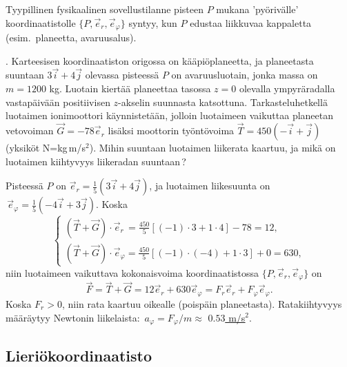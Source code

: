 Tyypillinen fysikaalinen sovellustilanne pisteen $P$ mukana 'pyörivälle' koordinaatistolle 
$\{P,\vec e_r,\vec e_\varphi\}$ syntyy, kun $P$ edustaa  liikkuvaa
kappaletta (esim.\ planeetta, avaruusalus). 
\begin{Exa}  . Karteesisen koordinaatiston
origossa on kääpiöplaneetta, ja planeetasta suuntaan $3\vec i+4\vec j$ olevassa pisteessä $P$
on avaruusluotain, jonka massa on $m=1200$ kg. Luotain kiertää planeettaa tasossa $z=0$
olevalla ympyräradalla vastapäivään positiivisen $z$-akselin suunnasta katsottuna.
Tarkasteluhetkellä luotaimen ionimoottori käynnistetään, jolloin luotaimeen vaikuttaa planeetan
vetovoiman $\vec G=-78\vec e_r$ lisäksi moottorin työntövoima $\vec T=450(-\vec i + \vec j)$
(yksiköt N=kg\,m/s$^2$). Mihin suuntaan luotaimen liikerata kaartuu, ja mikä on luotaimen
kiihtyvyys liikeradan suuntaan\,?
\end{Exa}
\ratk Pisteessä $P$ on $\vec e_r = \frac{1}{5}(3\vec i + 4\vec j)$, ja luotaimen liikesuunta on 
$\,\vec e_\varphi = \frac{1}{5}(-4\vec i + 3\vec j)$. Koska
\[ \begin{cases}
(\vec T + \vec G) \cdot \vec e_r\,    = \frac{450}{5}[(-1) \cdot 3 + 1 \cdot 4] - 78 = 12, \\
(\vec T + \vec G) \cdot \vec e_\varphi = \frac{450}{5}[(-1)\cdot(-4)+1 \cdot 3] + 0  = 630,
\end{cases} \] 
niin luotaimeen vaikuttava kokonaisvoima koordinaatistossa $\{P,\vec e_r,\vec e_\varphi\}$ on
\[
\vec F = \vec T + \vec G = 12 \vec e_r + 630 \vec e_\varphi 
                         = F_r\vec e_r + F_\varphi\vec e_\varphi.
\]
Koska $F_r>0$, niin rata kaartuu oikealle (poispäin planeetasta). Ratakiihtyvyys määräytyy
Newtonin liikelaista: $\,a_\varphi = F_\varphi/m \approx$ \underline{\underline{$0.53$ m/s$^2$}}.
\loppu

\subsection{Lieriökoordinaatisto}

